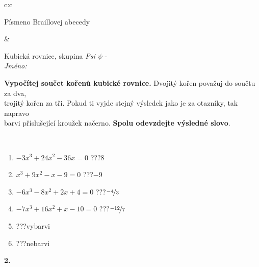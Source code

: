 \documentclass[10pt]{report}
\begin{document}
\begin{tabular}{c:c}
\begin{minipage}[c][104.5mm][t]{0.5\linewidth}
\begin{center}
\begin{minipage}{0.20\linewidth}
\begin{center}
{\small Písmeno Braillovej abecedy}
\end{center}
\end{minipage}
\end{center}
\end{minipage}
&
\begin{minipage}[c][104.5mm][t]{0.5\linewidth}
\begin{center}
\vspace{7mm}
{\huge Kubická rovnice, skupina \textit{Psi $\psi$} -}\\[5mm]
\textit{Jméno:}\phantom{xxxxxxxxxxxxxxxxxxxxxxxxxxxxxxxxxxxxxxxxxxxxxxxxxxxxxxxxxxxxxxxxx}\\[5mm]
\begin{minipage}{0.95\linewidth}
\begin{center}
\textbf{Vypočítej součet kořenů kubické rovnice.} Dvojitý kořen považuj do součtu za dva,\\trojitý kořen za tři. Pokud ti vyjde stejný výsledek jako je za otazníky, tak napravo\\barvi příslušející kroužek načerno. \textbf{Spolu odevzdejte výsledné slovo}.
\end{center}
\end{minipage}
\\[1mm]
\begin{minipage}{0.79\linewidth}
\begin{center}
\begin{varwidth}{\linewidth}
\begin{enumerate}
\Large
\item $-3x^3+24x^2-36x=0$\quad \dotfill\; ???\;\dotfill \quad $8$
\item $x^3+9x^2-x-9=0$\quad \dotfill\; ???\;\dotfill \quad $-9$
\item $-6x^3-8x^2+2x+4=0$\quad \dotfill\; ???\;\dotfill \quad $\nicefrac{-4}{3}$
\item $-7x^3+16x^2+x-10=0$\quad \dotfill\; ???\;\dotfill \quad $\nicefrac{-12}{7}$
\item \quad \dotfill\; ???\;\dotfill \quad vybarvi
\item \quad \dotfill\; ???\;\dotfill \quad nebarvi
\end{enumerate}
\end{varwidth}
\end{center}
\end{minipage}
\begin{minipage}{0.20\linewidth}
\begin{center}
{\Huge\bfseries 2.} \\[2mm]

\end{center}
\end{minipage}
\end{center}
\end{minipage}
\end{tabular}
\end{document}
